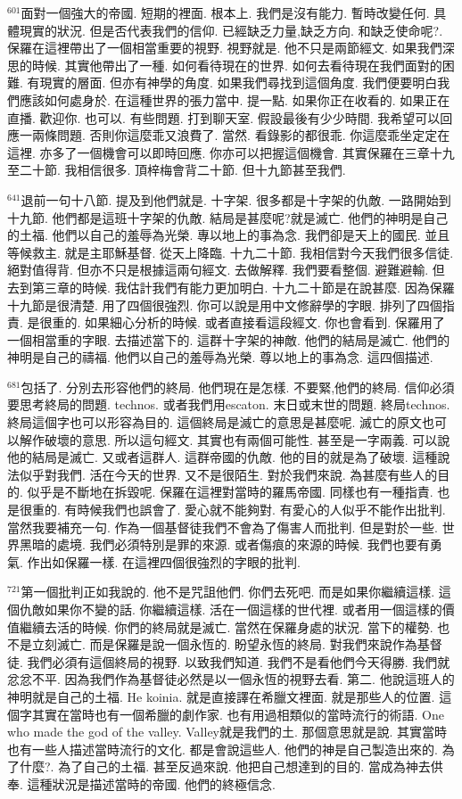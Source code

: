 \documentclass{book}
\begin{document}
$^{601}$面對一個強大的帝國.
短期的裡面.
根本上.
我們是沒有能力.
暫時改變任何.
具體現實的狀況.
但是否代表我們的信仰.
已經缺乏力量,缺乏方向.
和缺乏使命呢?.
保羅在這裡帶出了一個相當重要的視野.
視野就是.
他不只是兩節經文.
如果我們深思的時候.
其實他帶出了一種.
如何看待現在的世界.
如何去看待現在我們面對的困難.
有現實的層面.
但亦有神學的角度.
如果我們尋找到這個角度.
我們便要明白我們應該如何處身於.
在這種世界的張力當中.
提一點.
如果你正在收看的.
如果正在直播.
歡迎你.
也可以.
有些問題.
打到聊天室.
假設最後有少少時間.
我希望可以回應一兩條問題.
否則你這麼乖又浪費了.
當然.
看錄影的都很乖.
你這麼乖坐定定在這裡.
亦多了一個機會可以即時回應.
你亦可以把握這個機會.
其實保羅在三章十九至二十節.
我相信很多.
頂梓梅會背二十節.
但十九節甚至我們.

$^{641}$退前一句十八節.
提及到他們就是.
十字架.
很多都是十字架的仇敵.
一路開始到十九節.
他們都是這班十字架的仇敵.
結局是甚麼呢?就是滅亡.
他們的神明是自己的土福.
他們以自己的羞辱為光榮.
專以地上的事為念.
我們卻是天上的國民.
並且等候救主.
就是主耶穌基督.
從天上降臨.
十九二十節.
我相信對今天我們很多信徒.
絕對值得背.
但亦不只是根據這兩句經文.
去做解釋.
我們要看整個.
避難避輸.
但去到第三章的時候.
我估計我們有能力更加明白.
十九二十節是在說甚麼.
因為保羅十九節是很清楚.
用了四個很強烈.
你可以說是用中文修辭學的字眼.
排列了四個指責.
是很重的.
如果細心分析的時候.
或者直接看這段經文.
你也會看到.
保羅用了一個相當重的字眼.
去描述當下的.
這群十字架的神敵.
他們的結局是滅亡.
他們的神明是自己的禱福.
他們以自己的羞辱為光榮.
尊以地上的事為念.
這四個描述.

$^{681}$包括了.
分別去形容他們的終局.
他們現在是怎樣.
不要緊,他們的終局.
信仰必須要思考終局的問題.
technos.
或者我們用escaton.
末日或末世的問題.
終局technos.
終局這個字也可以形容為目的.
這個終局是滅亡的意思是甚麼呢.
滅亡的原文也可以解作破壞的意思.
所以這句經文.
其實也有兩個可能性.
甚至是一字兩義.
可以說他的結局是滅亡.
又或者這群人.
這群帝國的仇敵.
他的目的就是為了破壞.
這種說法似乎對我們.
活在今天的世界.
又不是很陌生.
對於我們來說.
為甚麼有些人的目的.
似乎是不斷地在拆毀呢.
保羅在這裡對當時的羅馬帝國.
同樣也有一種指責.
也是很重的.
有時候我們也誤會了.
愛心就不能夠對.
有愛心的人似乎不能作出批判.
當然我要補充一句.
作為一個基督徒我們不會為了傷害人而批判.
但是對於一些.
世界黑暗的處境.
我們必須特別是罪的來源.
或者傷痕的來源的時候.
我們也要有勇氣.
作出如保羅一樣.
在這裡四個很強烈的字眼的批判.

$^{721}$第一個批判正如我說的.
他不是咒詛他們.
你們去死吧.
而是如果你繼續這樣.
這個仇敵如果你不變的話.
你繼續這樣.
活在一個這樣的世代裡.
或者用一個這樣的價值繼續去活的時候.
你們的終局就是滅亡.
當然在保羅身處的狀況.
當下的權勢.
也不是立刻滅亡.
而是保羅是說一個永恆的.
盼望永恆的終局.
對我們來說作為基督徒.
我們必須有這個終局的視野.
以致我們知道.
我們不是看他們今天得勝.
我們就忿忿不平.
因為我們作為基督徒必然是以一個永恆的視野去看.
第二.
他說這班人的神明就是自己的土福.
He koinia.
就是直接譯在希臘文裡面.
就是那些人的位置.
這個字其實在當時也有一個希臘的劇作家.
也有用過相類似的當時流行的術語.
One who made the god of the valley.
Valley就是我們的土.
那個意思就是說.
其實當時也有一些人描述當時流行的文化.
都是會說這些人.
他們的神是自己製造出來的.
為了什麼?.
為了自己的土福.
甚至反過來說.
他把自己想達到的目的.
當成為神去供奉.
這種狀況是描述當時的帝國.
他們的終極信念.
\end{document}
